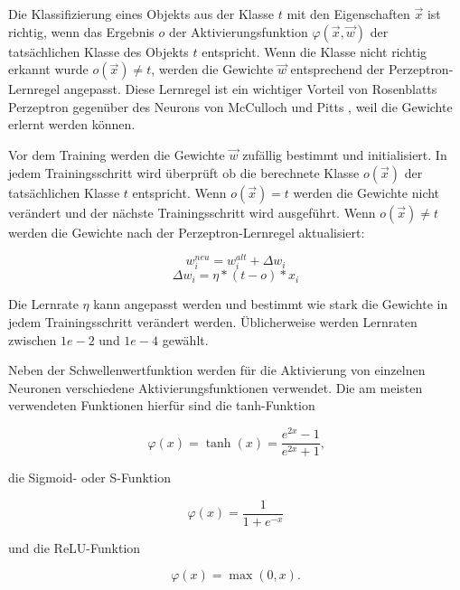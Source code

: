 Die Klassifizierung eines Objekts aus der Klasse $t$ mit den Eigenschaften $\vec{x}$ ist richtig, wenn das Ergebnis $o$ der Aktivierungsfunktion $\varphi(\vec{x},\vec{w})$ der tatsächlichen Klasse des Objekts $t$ entspricht. Wenn die Klasse nicht richtig erkannt wurde $o(\vec{x}) \neq t$, werden die Gewichte $\vec{w}$ entsprechend der Perzeptron-Lernregel angepasst. Diese Lernregel ist ein wichtiger Vorteil von Rosenblatts Perzeptron \cite{rosenblatt1958perceptron} gegenüber des Neurons von McCulloch und Pitts \cite{mcculloch1943logical}, weil die Gewichte erlernt werden können.

Vor dem Training werden die Gewichte $\vec{w}$ zufällig bestimmt und initialisiert. In jedem Trainingsschritt wird überprüft ob die berechnete Klasse $o(\vec{x})$ der tatsächlichen Klasse $t$ entspricht. Wenn $o(\vec{x}) = t$ werden die Gewichte nicht verändert und der nächste Trainingsschritt wird ausgeführt. Wenn $o(\vec{x}) \neq t$ werden die Gewichte nach der Perzeptron-Lernregel aktualisiert:

\begin{equation}
w^{neu}_i = w^{alt}_i + \Delta w_i
\end{equation}
\begin{equation}
\Delta w_i = \eta*(t-o)*x_i
\end{equation}

Die Lernrate $\eta$ kann angepasst werden und bestimmt wie stark die Gewichte in jedem Trainingsschritt verändert werden. Üblicherweise werden Lernraten zwischen $1e-2$ und $1e-4$ gewählt.

Neben der Schwellenwertfunktion werden für die Aktivierung von einzelnen Neuronen verschiedene Aktivierungsfunktionen verwendet. Die am meisten verwendeten Funktionen hierfür sind die \ac{tanh}-Funktion

\begin{equation}
\varphi(x) = \tanh(x) = \frac{e^{2x}-1}{e^{2x}+1} \text{,}
\end{equation}

\noindent die Sigmoid- oder S-Funktion

\begin{equation}
\varphi(x) = \frac{1}{1+e^{-x}}
\end{equation}

\noindent und die \ac{ReLU}-Funktion 

\begin{equation}
\varphi(x) = \max{(0, x)}.
\end{equation}

